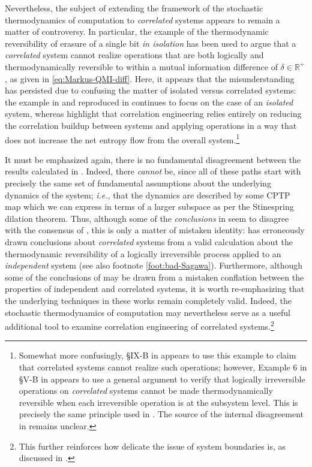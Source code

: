 \documentclass[preprints,article,accept,moreauthors,pdftex]{Definitions/mdpi}
\begin{document}
\begin{paracol}{2}
Nevertheless, the subject of extending the framework of the stochastic thermodynamics of computation to \emph{correlated} systems appears to remain a matter of controversy. In particular, the example of the thermodynamic reversibility of erasure of a single bit \emph{in isolation} has been used to argue that a \emph{correlated} system cannot realize operations that are both logically and thermodynamically reversible to within a mutual information difference of $\delta\in\mathbb{R}^{+}$, as given in \eqref{eq:Markus-QMI-diff}. Here, it appears that the misunderstanding has persisted due to confusing the matter of isolated versus correlated systems: the example in \cite{Ben73,Ben82,Sagawa13} and reproduced in \cite{Wol19a,Wol19b} continues to focus on the case of an \emph{isolated} system, whereas \cite{Mueller18,Goold15,Anderson19,Fra18} highlight that correlation engineering relies entirely on reducing the correlation buildup between systems and applying operations in a way that does not increase the net entropy flow from the overall system.\footnote{Somewhat more confusingly, \S IX-B in \cite{Wol19a} appears to use this example to claim that correlated systems cannot realize such operations; however, Example 6 in \S V-B in \cite{Wol19a} appears to use a general argument to  verify that logically irreversible operations on \emph{correlated} systems cannot be made thermodynamically reversible when each irreversible operation is at the subsystem level. This is precisely the same principle used in \cite{Mueller18,Goold15,Anderson19,Fra18}. The source of the internal disagreement in \cite{Wol19a} remains unclear.}

It must be emphasized again, there is no fundamental disagreement between the results calculated in \cite{Mueller18,Goold15,Anderson19,Fra18}. Indeed, there \emph{cannot} be, since all of these paths start with precisely the same set of fundamental assumptions about the underlying dynamics of the system; \emph{i.e.}, that the dynamics are described by some CPTP map which we can express in terms of a larger subspace as per the Stinespring dilation theorem. Thus, although some of the \emph{conclusions} in \cite{Wol19a, Wol19b} seem to disagree with the consensus of \cite{Mueller18,Goold15,Anderson19,Fra18,Sagawa19}, this is only a matter of mistaken identity: \cite{Wol19a, Wol19b} has erroneously drawn conclusions about \emph{correlated} systems from a valid calculation about the thermodynamic reversibility of a logically irreversible process applied to an \emph{independent} system (see also footnote \ref{foot:bad-Sagawa}). Furthermore, although some of the conclusions of \cite{Wol19a, Wol19b} may be drawn from a mistaken conflation between the properties of independent and correlated systems, it is worth re-emphasizing that the underlying techniques in these works remain completely valid. Indeed, the stochastic thermodynamics of computation may nevertheless serve as a useful additional tool to examine correlation engineering of correlated systems.\footnote{This further reinforces how delicate the issue of system boundaries is, as discussed in \cite{Anderson19}.}


\end{paracol}
\end{document}
